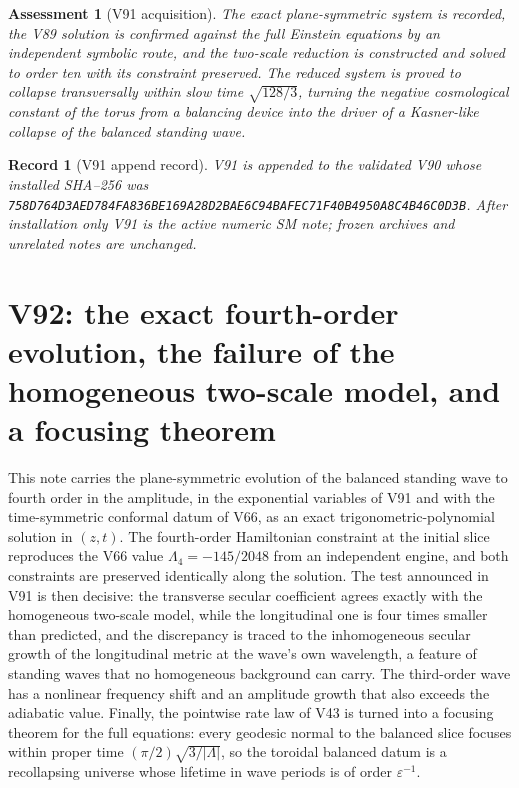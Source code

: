 \documentclass[11pt]{article}
\newtheorem{assessment}[theorem]{Assessment}
\newtheorem{record}[theorem]{Record}
\theoremstyle{remark}
\begin{document}
\begin{assessment}[V91 acquisition]
\label{ass:v19v91}
The exact plane-symmetric system is recorded, the V89 solution is
confirmed against the full Einstein equations by an independent
symbolic route, and the two-scale reduction is constructed and solved
to order ten with its constraint preserved.  The reduced system is
proved to collapse transversally within slow time \(\sqrt{128/3}\),
turning the negative cosmological constant of the torus from a
balancing device into the driver of a Kasner-like collapse of the
balanced standing wave.
\end{assessment}

\begin{record}[V91 append record]
\label{rec:v19v91}
V91 is appended to the validated V90 whose installed SHA--256 was
\texttt{758D764D3AED784FA836BE169A28D2BAE6C94BAFEC71F40B4950A8C4B46C0D3B}.
After installation only V91 is the active numeric SM note; frozen
archives and unrelated notes are unchanged.
\end{record}


\section{V92: the exact fourth-order evolution, the failure of the homogeneous two-scale model, and a focusing theorem}
\label{sec:v19v92}

This note carries the plane-symmetric evolution of the balanced
standing wave to fourth order in the amplitude, in the exponential
variables of V91 and with the time-symmetric conformal datum of
V66, as an exact trigonometric-polynomial solution in \((z,t)\).  The
fourth-order Hamiltonian constraint at the initial slice reproduces
the V66 value \(\Lambda_4=-145/2048\) from an independent engine, and
both constraints are preserved identically along the solution.  The
test announced in V91 is then decisive: the transverse secular
coefficient agrees exactly with the homogeneous two-scale model,
while the longitudinal one is four times smaller than predicted, and
the discrepancy is traced to the inhomogeneous secular growth of the
longitudinal metric at the wave's own wavelength, a feature of
standing waves that no homogeneous background can carry.  The
third-order wave has a nonlinear frequency shift and an amplitude
growth that also exceeds the adiabatic value.  Finally, the pointwise
rate law of V43 is turned into a focusing theorem for the full
equations: every geodesic normal to the balanced slice focuses within
proper time \((\pi/2)\sqrt{3/|\Lambda|}\), so the toroidal balanced
datum is a recollapsing universe whose lifetime in wave periods is of
order \(\varepsilon^{-1}\).
\end{document}
